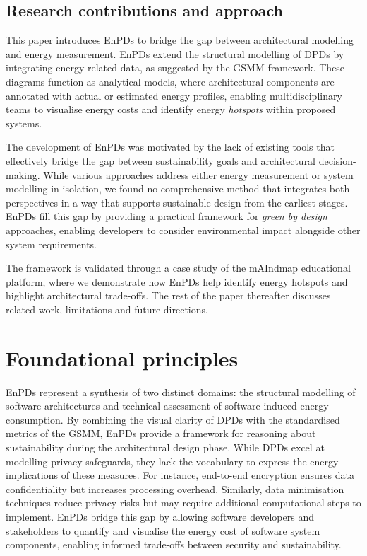 \subsection{Research contributions and approach}
This paper introduces EnPDs to bridge the gap between architectural modelling and energy measurement.
EnPDs extend the structural modelling of DPDs by integrating energy-related data, as suggested by the GSMM framework.
These diagrams function as analytical models, where architectural components are annotated with actual or estimated energy profiles, enabling multidisciplinary teams to visualise energy costs and identify energy \emph{hotspots} within proposed systems.

The development of EnPDs was motivated by the lack of existing tools that effectively bridge the gap between sustainability goals and architectural decision-making.
While various approaches address either energy measurement or system modelling in isolation, we found no comprehensive method that integrates both perspectives in a way that supports sustainable design from the earliest stages.
EnPDs fill this gap by providing a practical framework for \emph{green by design} approaches, enabling developers to consider environmental impact alongside other system requirements.

The framework is validated through a case study of the mAIndmap educational platform, where we demonstrate how EnPDs help identify energy hotspots and highlight architectural trade-offs.
The rest of the paper thereafter discusses related work, limitations and future directions.

\section{Foundational principles}
EnPDs represent a synthesis of two distinct domains: the structural modelling of software architectures and technical assessment of software-induced energy consumption.
By combining the visual clarity of DPDs with the standardised metrics of the GSMM, EnPDs provide a framework for reasoning about sustainability during the architectural design phase.
While DPDs excel at modelling privacy safeguards, they lack the vocabulary to express the energy implications of these measures.
For instance, end-to-end encryption ensures data confidentiality but increases processing overhead.
Similarly, data minimisation techniques reduce privacy risks but may require additional computational steps to implement.
EnPDs bridge this gap by allowing software developers and stakeholders to quantify and visualise the energy cost of software system components, enabling informed trade-offs between security and sustainability.


